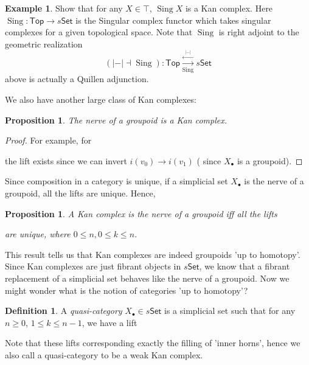 \documentclass[12pt]{amsart}
\newtheorem{prop}[thm]{Proposition}
\theoremstyle{definition}
\newtheorem{example}[thm]{Example}
\newtheorem{defn}[thm]{Definition}
\theoremstyle{remark}
\numberwithin{equation}{section}
\newcommand{\CN}{{\mathcal N}}
\newcommand{\1}{{\mathbb{1}}}
\newcommand{\set}{\mathsf{Set}}
\newcommand{\sing}{\operatorname{Sing}}
\newcommand{\Top}{\mathsf{Top}}
\begin{document}
\begin{example}
    Show that for any $X\in \top$, $\sing X$ is a Kan complex. Here $\sing: \Top \to s\set$ is the Singular complex functor which takes singular complexes for a given topological space. Note that $\sing$ is right adjoint to the geometric realization
	\begin{equation*}
	({\vert- \vert} \dashv \sing) \colon \Top \stackrel{\overset{{|-|}}{\longleftarrow}}{\underset{\sing}{\longrightarrow}} s\set
	\end{equation*}
	above is actually a Quillen adjunction.
\end{example}


We also have another large class of Kan complexes:
\begin{prop}
	The nerve of a groupoid is a Kan complex.
\end{prop}
\begin{proof}
	For example, for \begin{center}
	\end{center}
the lift exists since we can invert $i(v_0)\to i(v_1)$ ( since $X_{\bullet}$ is a groupoid). 
\end{proof}
Since composition in a category is unique, if a simplicial set $X_{\bullet}$ is the nerve of a groupoid, all the lifts are unique. Hence,
\begin{prop}
	A Kan complex is the nerve of a groupoid iff all the lifts
		\begin{center}
	\end{center}
are unique, where $0\le n, 0\le k \le n$.
\end{prop}
This result tells us that Kan complexes are indeed groupoids 'up to homotopy'. Since Kan complexes are just fibrant objects in  $s\set$, we know that a fibrant replacement of a simplicial set behaves like the nerve of a groupoid. Now we might wonder what is the notion of categories 'up to homotopy'?

\begin{defn}
		A {\it quasi-category} $X_{\bullet} \in s\set$ is a simplicial set such that for any $n\ge 0$, $1\le k \le n-1$, we have a lift
	\begin{center}
	\end{center}
Note that these lifts corresponding exactly the filling of 'inner horns', hence we also call a quasi-category to be a weak Kan complex.
\end{defn}
\end{document}
